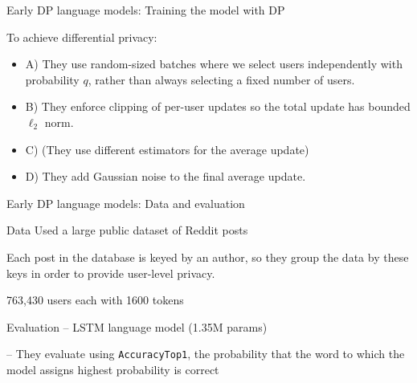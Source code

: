 \documentclass[12pt,aspectratio=169,handout]{beamer}
\begin{document}
\begin{frame}{Early DP language models: Training the model with DP}

To achieve differential privacy:

\begin{itemize}
\item A) They use random-sized batches where we select users independently with probability $q$, rather than always selecting a fixed number of users.
\item B) They enforce clipping of per-user updates so the total update has bounded $\ell_2$ norm.
\item C) (They use different estimators for the average update)
\item D) They add Gaussian noise to the final average update.
\end{itemize}



\end{frame}


\begin{frame}{Early DP language models: Data and evaluation}

\begin{block}{Data}
\small
Used a large public dataset of Reddit posts

Each post in the database is keyed by an author, so they group the data by these keys in order to provide user-level privacy.

763,430 users each with 1600 tokens
\end{block}

\begin{block}{Evaluation}
\small
-- LSTM language model (1.35M params)

-- They evaluate using \texttt{AccuracyTop1}, the probability that the word to which the model assigns highest probability is correct
\end{block}


\end{frame}
\end{document}
